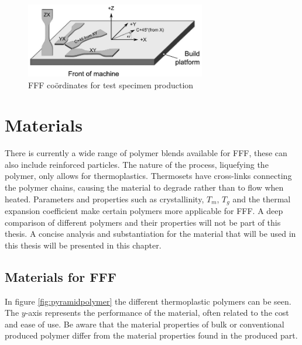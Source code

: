 

\begin{figure}[htb]
    \centering
    \includegraphics[width=0.7\textwidth]{chapter_2/figures/Coordinates.png}
    \caption{FFF coördinates for test specimen production}
    \label{fig:coordinates}
\end{figure}


\section{Materials}
There is currently a wide range of polymer blends available for FFF, these can also include reinforced particles. The nature of the process, liquefying the polymer, only allows for thermoplastics. Thermosets have cross-links connecting the polymer chains, causing the material to degrade rather than to flow when heated. Parameters and properties such as crystallinity, $T_m$, $T_g$ and the thermal expansion coefficient make certain polymers more applicable for FFF.  A deep comparison of different polymers and their properties will not be part of this thesis. A concise analysis and substantiation for the material that will be used in this thesis will be presented in this chapter.

\subsection{Materials for FFF}
In figure \ref{fig:pyramidpolymer} the different thermoplastic polymers can be seen. The $y$-axis represents the performance of the material, often related to the cost and ease of use. Be aware that the material properties of bulk or conventional produced polymer differ from the material properties found in the produced part. 

